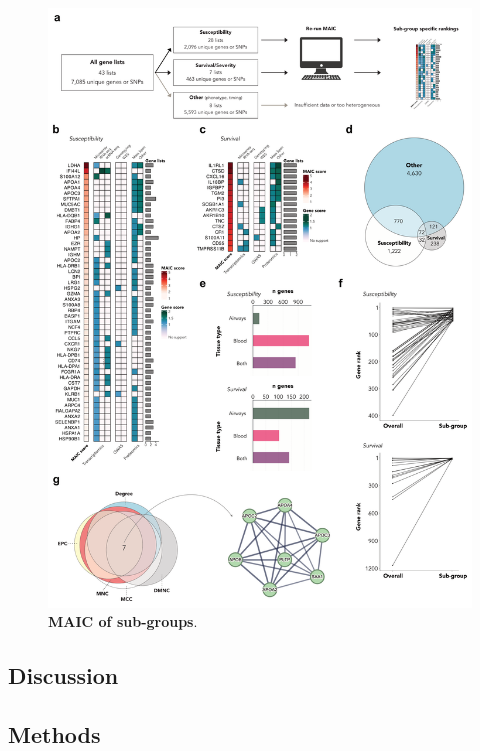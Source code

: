 \documentclass[
  11,
  a4paper,
]{article}
\begin{document}
\begin{figure}

{\centering \includegraphics{./img/Figure_4.png}

}

\caption{\label{fig-fig4}\textbf{MAIC of sub-groups}.}

\end{figure}

\newpage

\hypertarget{discussion}{%
\subsection{Discussion}\label{discussion}}

\hypertarget{methods}{%
\subsection{Methods}\label{methods}}
\end{document}
